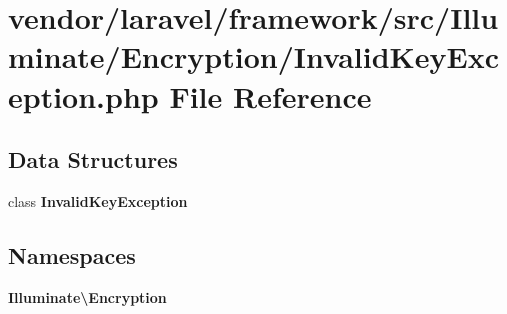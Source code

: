 \section{vendor/laravel/framework/src/\+Illuminate/\+Encryption/\+Invalid\+Key\+Exception.php File Reference}
\label{_invalid_key_exception_8php}
\subsection*{Data Structures}
\begin{DoxyCompactItemize}
\item 
class {\bf Invalid\+Key\+Exception}
\end{DoxyCompactItemize}
\subsection*{Namespaces}
\begin{DoxyCompactItemize}
\item 
 {\bf Illuminate\textbackslash{}\+Encryption}
\end{DoxyCompactItemize}
